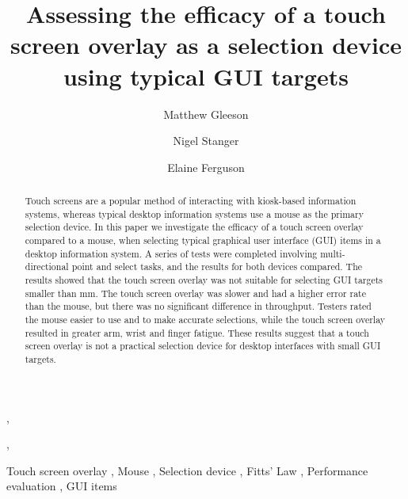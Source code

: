 \documentclass{elsart}
\begin{document}
\begin{frontmatter}



\title{Assessing the efficacy of a touch screen overlay as a selection
device using typical GUI targets}


\author[info]{Matthew Gleeson},
\author[info]{Nigel Stanger},
\author[hunt]{Elaine Ferguson}

\address[info]{Department of Information Science,}
\address[hunt]{Department of Human Nutrition, \\ University of Otago, PO Box 56, Dunedin, New Zealand}


\begin{abstract}

Touch screens are a popular method of interacting with kiosk-based
information systems, whereas typical desktop information systems use a
mouse as the primary selection device. In this paper we investigate the
efficacy of a touch screen overlay compared to a mouse, when selecting
typical graphical user interface (GUI) items in a desktop information
system. A series of tests were completed involving multi-directional
point and select tasks, and the results for both devices compared. The
results showed that the touch screen overlay was not suitable for
selecting GUI targets smaller than \unit[4]{mm}. The touch screen
overlay was slower and had a higher error rate than the mouse, but there
was no significant difference in throughput. Testers rated the mouse
easier to use and to make accurate selections, while the touch screen
overlay resulted in greater arm, wrist and finger fatigue. These results
suggest that a touch screen overlay is not a practical selection device
for desktop interfaces with small GUI targets.

\end{abstract}

\begin{keyword}
Touch screen overlay \sep
Mouse \sep
Selection device \sep
Fitts' Law \sep
Performance evaluation \sep
GUI items
\end{keyword}

\end{frontmatter}
\end{document}
